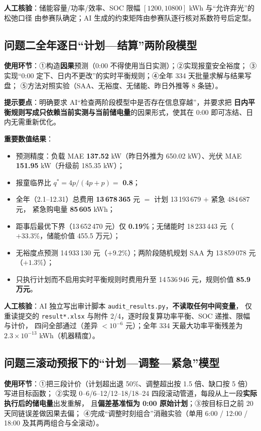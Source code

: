 \documentclass[11pt,a4paper,fontset=fandol]{ctexart}
\begin{document}
\textbf{人工核验}：储能容量/功率/效率、SOC 限幅 $[1200,10800]$ kWh 与“允许弃光”的松弛口径
由参赛队确定；AI 生成的约束矩阵由参赛队逐行核对系数符号后定型。

\subsection*{问题二\quad 全年逐日“计划—结算”两阶段模型}

\textbf{使用环节}：①构造\textbf{因果}预测（0:00 不得使用当日实测）；②实现报童安全裕度；
③实现“0:00 定下、日内不更改”的实时平衡规则；④全年 334 天批量求解与结果写盘；
⑤方法对照实验（SAA、无裕度、无储能、昨日外推等 8 条链）。

\textbf{提示要点}：明确要求 AI“检查两阶段模型中是否存在信息穿越”，并要求把
\textbf{日内平衡规则写成只依赖当前实测与当前储电量}的因果形式，使其在 0:00 即可冻结、日内无需重新优化。

\textbf{重要数值结果}：
\begin{itemize}[itemsep=1pt]
  \item 预测精度：负载 MAE \textbf{137.52} kW（昨日外推为 650.02 kW）、光伏 MAE \textbf{151.95} kW（升级前 185.35 kW）；
  \item 报童临界比 $q^{*}=4p/(4p+p)=$ \textbf{0.8}；
  \item 全年（2.1--12.31）总费用 \textbf{13\,678\,365} 元 $=$ 计划 13\,193\,679 $+$ 紧急 484\,687 元，
        紧急购电量 \textbf{85\,605} kWh；
  \item 距事后最优下界（13\,652\,470 元）仅 \textbf{0.19\%}；无储能时 18\,233\,443 元（$+33.3\%$，储能价值 455.5 万元）；
  \item 无裕度点预测 14\,933\,130 元（$+9.2\%$）；两阶段随机规划 SAA 为 13\,859\,078 元（$+1.3\%$）；
  \item 只执行计划而不启用实时平衡规则时费用升至 14\,536\,946 元，规则价值 \textbf{85.9 万元}。
\end{itemize}

\textbf{人工核验}：AI 独立写出审计脚本 \texttt{audit\_results.py}，\textbf{不读取任何中间变量}，
仅重读提交的 \texttt{result*.xlsx} 与附件 2/4，逐时段复算功率平衡、SOC 递推、限幅与计价，
四问全部通过（差异 $<10^{-6}$ 元）；全年 334 天最大功率平衡残差为 $2.3\times10^{-13}$ kWh（机器精度）。

\subsection*{问题三\quad 滚动预报下的“计划—调整—紧急”模型}

\textbf{使用环节}：①把三段计价（计划超出退 50\%、调整超出按 1.5 倍、缺口按 5 倍）写进目标函数；
②实现 0--6/6--12/12--18/18--24 四段滚动管道，每段从上一段\textbf{实际执行后的储电量}出发重解，
且\textbf{偏差基准恒为 0:00 原始计划}；③按目标日之前 20 天同链误差做因果去偏；
④完成“调整时刻组合”消融实验（单用 6:00 / 12:00 / 18:00 及其两两组合与全滚动）。
\end{document}
